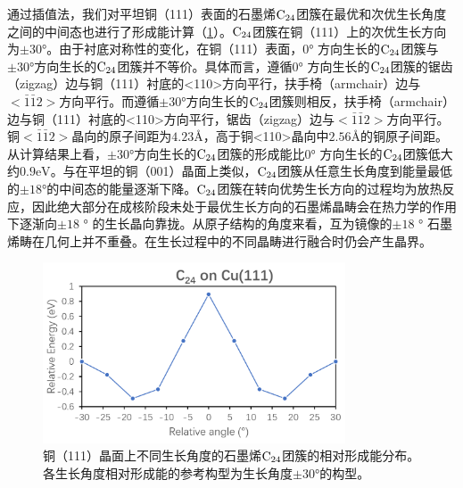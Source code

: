         通过插值法，我们对平坦铜（111）表面的石墨烯$\rm{C_{24}}$团簇在最优和次优生长角度之间的中间态也进行了形成能计算（\ref{GO_111_energy}）。$\rm{C_{24}}$团簇在铜（111）上的次优生长方向为$\pm 30$\si{\degree}。由于衬底对称性的变化，在铜（111）表面，$0\si{\degree}$ 方向生长的$\rm{C_{24}}$团簇与$\pm 30\si{\degree}$方向生长的$\rm{C_{24}}$团簇并不等价。具体而言，遵循$0\si{\degree}$ 方向生长的$\rm{C_{24}}$团簇的锯齿（zigzag）边与铜（111）衬底的<110>方向平行，扶手椅（armchair）边与$<\bar{1}\bar{1}2>$方向平行。而遵循$\pm 30\si{\degree}$方向生长的$\rm{C_{24}}$团簇则相反，扶手椅（armchair）边与铜（111）衬底的<110>方向平行，锯齿（zigzag）边与$<\bar{1}\bar{1}2>$方向平行。铜$<\bar{1}\bar{1}2>$晶向的原子间距为$4.23 \si{\angstrom}$，高于铜<110>晶向中$2.56 \si{\angstrom}$的铜原子间距。从计算结果上看，$\pm 30\si{\degree}$方向生长的$\rm{C_{24}}$团簇的形成能比$0\si{\degree}$ 方向生长的$\rm{C_{24}}$团簇低大约$0.9\si{\electronvolt}$。与在平坦的铜（001）晶面上类似，$\rm{C_{24}}$团簇从任意生长角度到能量最低的$\pm 18 \si{\degree}$的中间态的能量逐渐下降。$\rm{C_{24}}$团簇在转向优势生长方向的过程均为放热反应，因此绝大部分在成核阶段未处于最优生长方向的石墨烯晶畴会在热力学的作用下逐渐向$\pm 18$ \si{\degree} 的生长晶向靠拢。从原子结构的角度来看，互为镜像的$\pm 18$ \si{\degree} 石墨烯畴在几何上并不重叠。在生长过程中的不同晶畴进行融合时仍会产生晶界。

        \begin{figure}[htbp]
            \includegraphics[width=0.8\textwidth]{pic/GO_C24_flat_111_energy.png}
            \caption{铜（111）晶面上不同生长角度的石墨烯$\rm{C_{24}}$团簇的相对形成能分布。各生长角度相对形成能的参考构型为生长角度$\pm 30$\si{\degree}的构型。
            }
            \label{GO_111_energy}
        \end{figure}


